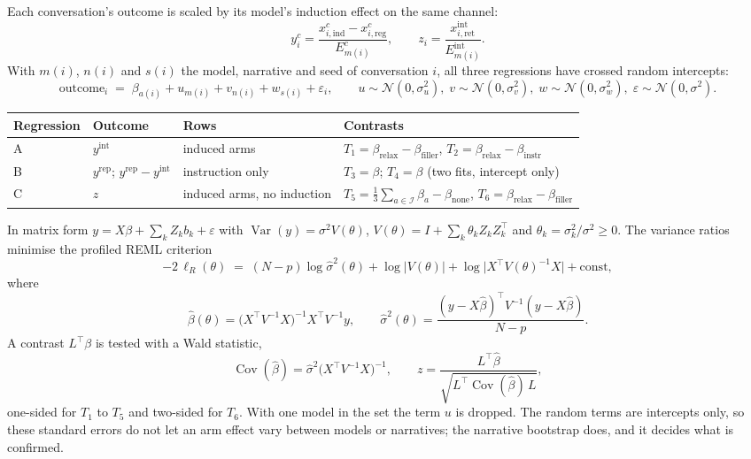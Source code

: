 \documentclass[11pt]{article}
\newcommand{\ind}{\mathrm{ind}}
\newcommand{\reg}{\mathrm{reg}}
\newcommand{\ret}{\mathrm{ret}}
\newcommand{\rlx}{\mathrm{relax}}
\newcommand{\flr}{\mathrm{filler}}
\newcommand{\instr}{\mathrm{instr}}
\newcommand{\none}{\mathrm{none}}
\newcommand{\rep}{\mathrm{rep}}
\newcommand{\intl}{\mathrm{int}}
\begin{document}
Each conversation's outcome is scaled by its model's induction effect on the same channel:
\begin{equation}
  y^{c}_{i} = \frac{x^{c}_{i,\ind} - x^{c}_{i,\reg}}{E^{c}_{m(i)}}, \qquad
  z_{i} = \frac{x^{\intl}_{i,\ret}}{E^{\intl}_{m(i)}} .
\end{equation}
With $m(i)$, $n(i)$ and $s(i)$ the model, narrative and seed of conversation $i$, all three
regressions have crossed random intercepts:
\begin{equation}
  \text{outcome}_{i} \;=\; \beta_{a(i)} + u_{m(i)} + v_{n(i)} + w_{s(i)} + \varepsilon_{i},
  \qquad u \sim \mathcal{N}(0, \sigma_u^2),\; v \sim \mathcal{N}(0, \sigma_v^2),\;
  w \sim \mathcal{N}(0, \sigma_w^2),\; \varepsilon \sim \mathcal{N}(0, \sigma^2).
\end{equation}
\begin{center}
\begin{tabular}{llll}
\toprule
Regression & Outcome & Rows & Contrasts \\
\midrule
A & $y^{\intl}$ & induced arms & $T_1 = \beta_{\rlx} - \beta_{\flr}$,\; $T_2 = \beta_{\rlx} - \beta_{\instr}$ \\
B & $y^{\rep}$;\; $y^{\rep} - y^{\intl}$ & instruction only & $T_3 = \beta$;\; $T_4 = \beta$ (two fits, intercept only) \\
C & $z$ & induced arms, no induction &
  $T_5 = \tfrac13 \sum_{a \in \mathcal{I}} \beta_a - \beta_{\none}$,\; $T_6 = \beta_{\rlx} - \beta_{\flr}$ \\
\bottomrule
\end{tabular}
\end{center}
In matrix form $y = X\beta + \sum_k Z_k b_k + \varepsilon$ with
$\operatorname{Var}(y) = \sigma^2 V(\theta)$, $V(\theta) = I + \sum_k \theta_k Z_k Z_k^{\top}$ and
$\theta_k = \sigma_k^2 / \sigma^2 \ge 0$. The variance ratios minimise the profiled REML criterion
\begin{equation}
  -2\,\ell_R(\theta) \;=\; (N - p) \log \hat\sigma^2(\theta) + \log |V(\theta)|
      + \log \bigl| X^{\top} V(\theta)^{-1} X \bigr| + \text{const},
\end{equation}
where
\begin{equation}
  \hat\beta(\theta) = \bigl(X^{\top} V^{-1} X\bigr)^{-1} X^{\top} V^{-1} y, \qquad
  \hat\sigma^2(\theta) = \frac{(y - X\hat\beta)^{\top} V^{-1} (y - X\hat\beta)}{N - p} .
\end{equation}
A contrast $L^{\top}\beta$ is tested with a Wald statistic,
\begin{equation}
  \operatorname{Cov}(\hat\beta) = \hat\sigma^2 \bigl(X^{\top} V^{-1} X\bigr)^{-1}, \qquad
  z = \frac{L^{\top}\hat\beta}{\sqrt{L^{\top} \operatorname{Cov}(\hat\beta)\, L}},
\end{equation}
one-sided for $T_1$ to $T_5$ and two-sided for $T_6$. With one model in the set the term $u$ is
dropped. The random terms are intercepts only, so these standard errors do not let an arm effect
vary between models or narratives; the narrative bootstrap does, and it decides what is confirmed.
\end{document}
